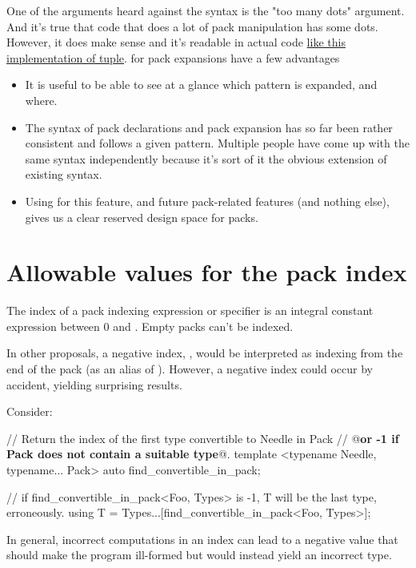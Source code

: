 \documentclass{wg21}
\begin{document}
One of the arguments heard against the  syntax is the "too many dots" argument.
And it's true that code that does a lot of pack manipulation has some dots.
However, it does make sense and it's readable in actual code \href{https://github.com/seanbaxter/circle/blob/master/tuple/tuple.hxx}{like this implementation of tuple}.
 for pack expansions have a few advantages
\begin{itemize}
\item It is useful to be able to see at a glance which pattern is expanded, and where.
\item The syntax of pack declarations and pack expansion has so far been rather consistent and follows a given pattern. Multiple people have come up with the same syntax independently because it's sort of it the obvious extension of existing syntax.
\item Using  for this feature, and future pack-related features (and nothing else), gives us a clear reserved design space for packs.
\end{itemize}

\section{Allowable values for the pack index}

The index of a pack indexing expression or specifier is an integral constant expression between 0 and .
Empty packs can't be indexed.

In other proposals, a negative index, , would be interpreted as
indexing from the end of the pack (as an alias of ).
However, a negative index could occur by accident, yielding surprising results.

Consider:

\begin{colorblock}
// Return the index of the first type convertible to Needle in Pack
// @\textbf{or -1 if Pack does not contain a suitable type}@.
template <typename Needle, typename... Pack>
auto find_convertible_in_pack;

// if find_convertible_in_pack<Foo, Types> is -1, T will be the last type, erroneously.
using T = Types...[find_convertible_in_pack<Foo, Types>];
\end{colorblock}

In general, incorrect computations in an index can lead to a negative value that should make the program ill-formed but would instead
yield an incorrect type.
\end{document}
